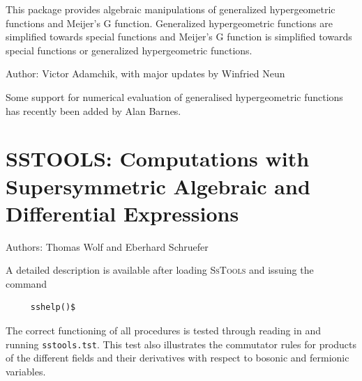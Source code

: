 
This package provides algebraic manipulations of generalized
hypergeometric functions and Meijer's G function.  Generalized
hypergeometric functions are simplified towards special functions and
Meijer's G function is simplified towards special functions or generalized
hypergeometric functions.

Author: Victor Adamchik, with major updates by Winfried Neun

Some support for numerical evaluation of generalised hypergeometric functions
has recently been added by Alan Barnes.



\newpage

\section{SSTOOLS: Computations with Supersymmetric Algebraic and Differential
Expressions}


Authors: Thomas Wolf and Eberhard Schruefer


A detailed %
description is available after loading \textsc{SsTools} and issuing the command
\begin{verbatim}
     sshelp()$
\end{verbatim}
The correct functioning of all procedures is tested through
reading in and running \texttt{sstools.tst}. This test also illustrates
the commutator rules for products of the different fields and their
derivatives with respect to bosonic and fermionic variables.

